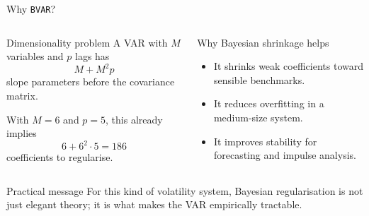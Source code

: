 \documentclass[10pt, aspectratio=169]{beamer}
\begin{document}
\begin{frame}{Why \texttt{BVAR}?}
\small
\begin{columns}[T,onlytextwidth]
  \begin{block}{Dimensionality problem}
  A VAR with $M$ variables and $p$ lags has
  \[
    M + M^2 p
  \]
  slope parameters before the covariance matrix.

  With $M=6$ and $p=5$, this already implies
  \[
    6 + 6^2 \cdot 5 = 186
  \]
  coefficients to regularise.
  \end{block}

  \begin{block}{Why Bayesian shrinkage helps}
  \begin{itemize}
    \item It shrinks weak coefficients toward sensible benchmarks.
    \item It reduces overfitting in a medium-size system.
    \item It improves stability for forecasting and impulse analysis.
  \end{itemize}
  \end{block}
\end{columns}

\vspace{0.4em}
\begin{alertblock}{Practical message}
For this kind of volatility system, Bayesian regularisation is not just elegant theory; it is what makes the VAR empirically tractable.
\end{alertblock}
\end{frame}
\end{document}
